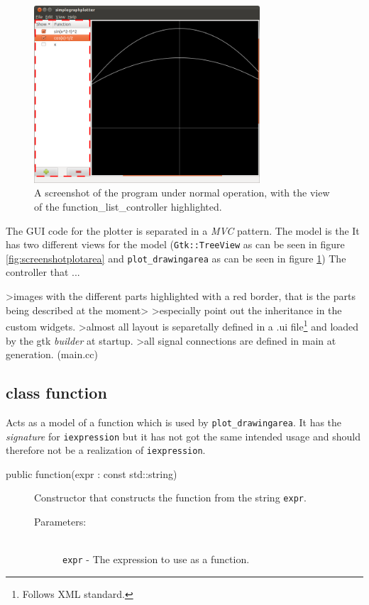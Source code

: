 \documentclass[a4paper,11pt]{kth-mag}
\begin{document}
\begin{figure}[ht]
\begin{center}
    \includegraphics[width=0.75\textwidth]{screenshot00_function_list_controller.png}
    \caption{\small{A screenshot of the program under normal operation, with
    the view of the function\_list\_controller highlighted.}}
   \label{fig:screenshotfunctionlistcontroller}
\end{center}
\end{figure}

The GUI code for the plotter is separated in a \emph{MVC} pattern. 
The model is the 
It has two different views for the model 
(\texttt{Gtk::TreeView} as can be seen
in figure \ref{fig:screenshotplotarea} and
\texttt{plot\_drawingarea} as can be seen in figure
\ref{fig:screenshotfunctionlistcontroller})
The controller that ...

>images with the different parts highlighted with a red border, that is the parts being described at the moment>
>especially point out the inheritance in the custom widgets.
>almost all layout is separetally defined in a .ui file\footnote{Follows XML
standard.} and loaded by the gtk \emph{builder} at startup.
>all signal connections are defined in main at generation. (main.cc)


\subsection{class function}
Acts as a model of a function which is used by \texttt{plot\_drawingarea}.
It has the \emph{signature} for \texttt{iexpression} but it has not got the
same intended usage and should therefore not be a realization of
\texttt{iexpression}.

\begin{description}
    \item[public function(expr : const std::string)] Constructor 
    that constructs the function from the string \texttt{expr}.
    \begin{description}
        \item[Parameters:]~\\
            \verb+expr+ - The expression to use as a function.
    \end{description}
\end{description}
\end{document}
